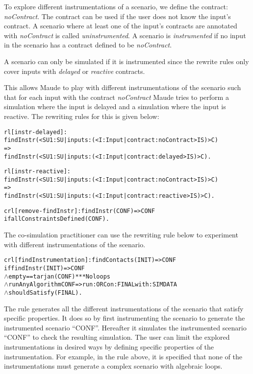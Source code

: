 To explore different instrumentations of a scenario, we define the contract: \emph{noContract}.
The contract can be used if the user does not know the input's contract.
A scenario where at least one of the input's contracts are annotated with \emph{noContract} is called \emph{uninstrumented}.
A scenario is \emph{instrumented} if no input in the scenario has a contract defined to be \emph{noContract}.

A scenario can only be simulated if it is instrumented since the rewrite rules only cover inputs with \emph{delayed} or \emph{reactive} contracts.

This allows Maude to play with different instrumentations of the scenario such that for each input with the contract \textit{noContract} Maude tries to perform a simulation where the input is delayed and a simulation where the input is reactive.
The rewriting rules for this is given below:
\begin{alltt}
  \small
rl [instr-delayed]: 
findInstr(< SU1 : SU | inputs : (< I : Input | contract : noContract > IS) > C)
=>
findInstr(< SU1 : SU | inputs : (< I : Input | contract : delayed > IS) > C) .

rl [instr-reactive]: 
findInstr(< SU1 : SU | inputs : (< I : Input | contract : noContract > IS) > C)
=>
findInstr(< SU1 : SU | inputs : (< I : Input | contract : reactive > IS) > C) .

crl [remove-findInstr]: findInstr(CONF) => CONF 
  if allConstraintsDefined(CONF) .
\end{alltt}

The co-simulation practitioner can use the rewriting rule below to experiment with different instrumentations of the scenario.

\begin{alltt}
  \small
  crl [findInstrumentation]: findContacts(INIT) => CONF
      if findInstr(INIT) => CONF
      \(\land\) empty == tarjan(CONF) *** No loops
      \(\land\) runAnyAlgorithm CONF => run: ORC on: FINAL with: SIMDATA
      \(\land\) shouldSatisfy(FINAL) .
  \end{alltt}

The rule generates all the different instrumentations of the scenario that satisfy specific properties.
It does so by first instrumenting the scenario to generate the instrumented scenario ``CONF''.
Hereafter it simulates the instrumented scenario ``CONF'' to check the resulting simulation.
The user can limit the explored instrumentations in desired ways by defining specific properties of the instrumentation.
For example, in the rule above, it is specified that none of the instrumentations must generate a complex scenario with algebraic loops.


